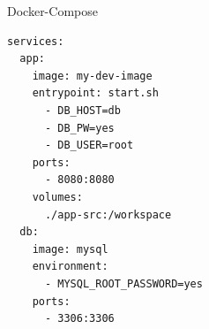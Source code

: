 \documentclass{beamer}
\begin{document}
\begin{frame}[fragile]{Docker-Compose}
  \begin{lstlisting}[language=docker-compose-2,basicstyle=\scriptsize,caption={Exemplary docker-compose.yml file},breaklines=true,label={code::compose_example}]
services:
  app:
    image: my-dev-image
    entrypoint: start.sh
      - DB_HOST=db
      - DB_PW=yes
      - DB_USER=root
    ports:
      - 8080:8080
    volumes:
      ./app-src:/workspace
  db:
    image: mysql
    environment:
      - MYSQL_ROOT_PASSWORD=yes
    ports:
      - 3306:3306
    \end{lstlisting}
\end{frame}




\end{document}

